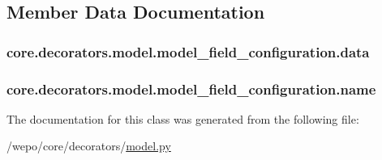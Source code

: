 \subsection{Member Data Documentation}
\hypertarget{classcore_1_1decorators_1_1model_1_1model__field__configuration_ae2ed0506f2a3f467dbc5791e61e5a459}{
\subsubsection[{data}]{\setlength{\rightskip}{0pt plus 5cm}core.\-decorators.\-model.\-model\-\_\-field\-\_\-configuration.\-data}}\label{classcore_1_1decorators_1_1model_1_1model__field__configuration_ae2ed0506f2a3f467dbc5791e61e5a459}
\hypertarget{classcore_1_1decorators_1_1model_1_1model__field__configuration_aa400bdb842117e4d6e8b4bfcbbd20603}{
\subsubsection[{name}]{\setlength{\rightskip}{0pt plus 5cm}core.\-decorators.\-model.\-model\-\_\-field\-\_\-configuration.\-name}}\label{classcore_1_1decorators_1_1model_1_1model__field__configuration_aa400bdb842117e4d6e8b4bfcbbd20603}


The documentation for this class was generated from the following file\-:\begin{DoxyCompactItemize}
\item 
/wepo/core/decorators/\hyperlink{model_8py}{model.\-py}\end{DoxyCompactItemize}
